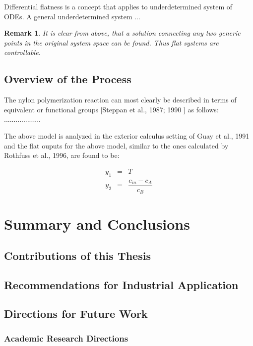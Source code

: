 \documentclass[11pt]{report}
\newtheorem{remark}[theorem]{Remark}
\begin{document}
Differential flatness is a concept that applies to underdetermined system of
ODEs. A general underdetermined system ...

\begin{remark}
It is clear from above, that a solution connecting any two generic points in
the original system space can be found. Thus flat systems are controllable.
\end{remark}

\section{Overview of the Process}

The nylon polymerization reaction can most clearly be described in terms of
equivalent or functional groups [Steppan et al., 1987; 1990\nocite{steppan1} 
\nocite{steppan2}] as follows: ...................

The above model is analyzed in the exterior calculus setting of Guay et al.,
1991 and the flat ouputs for the above model, similar to the ones calculated
by Rothfuss et al., 1996, are found to be:

\begin{eqnarray*}
y_{1} &=&T \\
y_{2} &=&\dfrac{c_{in}-c_{A}}{c_{B}}
\end{eqnarray*}

\chapter{Summary and Conclusions}

\section{Contributions of this Thesis}

\section{Recommendations for Industrial Application}

\section{Directions for Future Work}

\subsection{Academic Research Directions}
\end{document}
